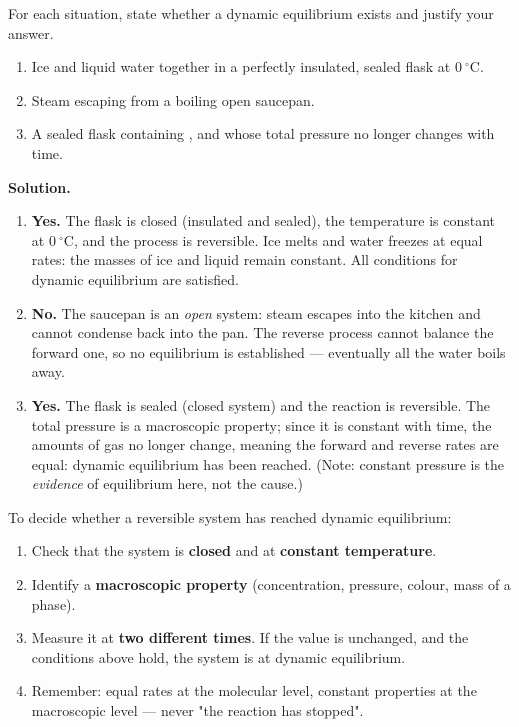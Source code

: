 \documentclass[11pt]{article}
\begin{document}
\begin{exoresolu}
For each situation, state whether a dynamic equilibrium exists and justify your answer.
\begin{enumerate}
\item Ice and liquid water together in a perfectly insulated, sealed flask at $0\ ^{\circ}\mathrm{C}$.
\item Steam escaping from a boiling open saucepan.
\item A sealed flask containing ,  and  whose total pressure no longer changes with time.
\end{enumerate}
\tcblower
\textbf{Solution.}
\begin{enumerate}
\item \textbf{Yes.} The flask is closed (insulated and sealed), the temperature is constant at $0\ ^{\circ}\mathrm{C}$, and the process  is reversible. Ice melts and water freezes at equal rates: the masses of ice and liquid remain constant. All conditions for dynamic equilibrium are satisfied.
\item \textbf{No.} The saucepan is an \emph{open} system: steam escapes into the kitchen and cannot condense back into the pan. The reverse process cannot balance the forward one, so no equilibrium is established — eventually all the water boils away.
\item \textbf{Yes.} The flask is sealed (closed system) and the reaction  is reversible. The total pressure is a macroscopic property; since it is constant with time, the amounts of gas no longer change, meaning the forward and reverse rates are equal: dynamic equilibrium has been reached. (Note: constant pressure is the \emph{evidence} of equilibrium here, not the cause.)
\end{enumerate}
\end{exoresolu}

\begin{methode}
To decide whether a reversible system has reached dynamic equilibrium:
\begin{enumerate}
\item Check that the system is \textbf{closed} and at \textbf{constant temperature}.
\item Identify a \textbf{macroscopic property} (concentration, pressure, colour, mass of a phase).
\item Measure it at \textbf{two different times}. If the value is unchanged, and the conditions above hold, the system is at dynamic equilibrium.
\item Remember: equal rates at the molecular level, constant properties at the macroscopic level — never "the reaction has stopped".
\end{enumerate}
\end{methode}
\end{document}
